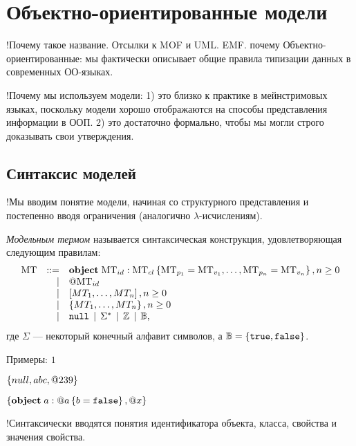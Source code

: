 \chapter{Объектно-ориентированные модели}

!Почему такое название. Отсылки к MOF и UML. EMF. 
почему Объектно-ориентированные: мы фактически описывает общие правила типизации данных в современных ОО-языках.

!Почему мы используем модели: 
1) это близко к практике в мейнстримовых языках, поскольку модели хорошо отображаются на способы представления информации в ООП. 
2) это достаточно формально, чтобы мы могли строго доказывать свои утверждения.

\section{Синтаксис моделей}

!Мы вводим понятие модели, начиная со структурного представления и постепенно вводя ограничения (аналогично $\lambda$-исчислениям).

\begin{Def}
\emph{Модельным термом} называется синтаксическая конструкция, удовлетворяющая следующим правилам:
\[
\begin{array}{rrl}
	\mbox{MT} & ::= & \mathbf{object}\;\mbox{MT}_{id} : \mbox{MT}_{cl}\left\{ \mbox{MT}_{p_1}=\mbox{MT}_{v_1},\ldots,\mbox{MT}_{p_n}=\mbox{MT}_{v_n} \right\}, n \ge 0 \\ 
	           &   | & @\mbox{MT}_{id} \\ 
	           &   | & \left[MT_1,\ldots,MT_n\right], n \ge 0 \\ 
	           &   | & \left\{MT_1,\ldots,MT_n\right\}, n \ge 0 \\ 
	           &   | & \mathtt{null} \;\,|\;\, \Sigma^* \;\,|\;\, \mathbb{Z} \;\,|\;\, \mathbb{B}, \\
\end{array}
\]
где $\Sigma$ --- некоторый конечный алфавит символов, а $\mathbb{B} = \left\{ \mathtt{true}, \mathtt{false} \right\}$.
\end{Def}

Примеры:
$1$

$\left\{null, abc, @239\right\}$

$\left\{\mathbf{object}\;a : @a\left\{ b=\mathtt{false} \right\}, @x\right\}$

!Синтаксически вводятся понятия идентификатора объекта, класса, свойства и значения свойства.

